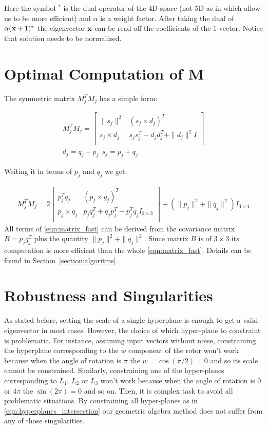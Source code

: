 \documentclass{birkjour}
\numberwithin{equation}{section}
\begin{document}
Here the symbol $^*$ is the dual operator of the $4$D space (not $5$D as in \cite{DeKeninck2019} which allow us to be more efficient) and $\alpha$ is a weight factor. After taking the dual of $\alpha (\textbf x + 1)^*$ the eigenvector $\textbf x$ can be read off the coefficients of the $1$-vector. Notice that solution needs to be normalized.

\section{Optimal Computation of M}

The symmetric matrix $M_j^T M_j$ has a simple form:

\begin{eqnarray*}
	M_j^T M_j = 
	\left[\begin{array}{cc}
		\| s_j \|^2        &         (s_j \times d_j)^T \\
		s_j \times d_j  &    s_j s_j^T - d_j d_j^T + \| d_j \|^2 I \\
	\end{array}\right]\\
	d_j = q_j - p_j \ \ s_j = p_j + q_j
\end{eqnarray*}

Writing it in terms of $p_j$ and $q_j$ we get:

\begin{eqnarray}
   \label{eqn:matrix_fast}
   	M_j^T M_j = 2
	\left[\begin{array}{cc}
		p_j^T q_j       &         (p_j \times q_j)^T \\
		p_j \times q_j  &    p_j q_j^T + q_j p_j^T - p_j^Tq_j I_{3\times3} \\
	\end{array}\right]
    + (\| p_j \|^2 + \| q_j \|^2) I_{4\times4}
\end{eqnarray}
All terms of \ref{eqn:matrix_fast} can be derived from the covariance matrix $B = p_j q_j^T$ plus the quantity $\| p_j \|^2 + \| q_j \|^2$. Since matrix $B$ is of $3\times3$ its computation is more efficient than the whole \ref{eqn:matrix_fast}. Details can be found in Section~\ref{section:algoritms}.

\section{Robustness and Singularities}
\label{section:robustness}

As stated before, setting the scale of a single hyperplane is enough to get a valid eigenvector in most cases. However, the choice of which hyper-plane to constraint is problematic. For instance,  assuming input vectors without noise, constraining the hyperplane corresponding to the $w$ component of the rotor won't work because when the angle of rotation is $\pi$ the $w = \cos(\pi/2) = 0$ and so its scale cannot be constrained. Similarly, constraining one of the hyper-planes corresponding to $L_1$, $L_2$ or $L_3$ won't work because when the angle of rotation is $0$ or $4 \pi$ the $\sin(2 \pi) = 0$ and so on. Then, it is complex task to avoid all problematic situations. By constraining all hyper-planes as in \ref{eqn:hyperplanes_intersection} our geometric algebra method does not suffer from any of those singularities.
\end{document}
